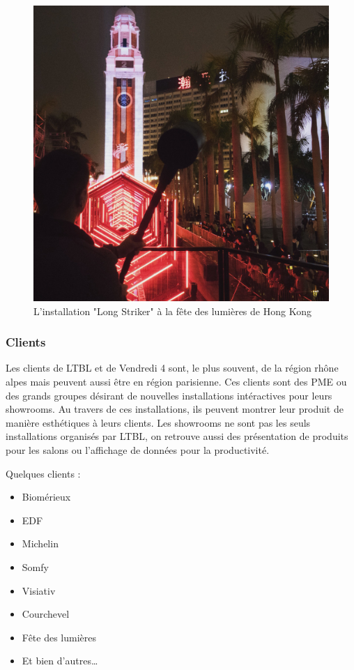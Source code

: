 \documentclass{article}
\begin{document}
\begin{figure}[h]
    \centering
    \includegraphics[scale=0.1]{long-striker.jpg}
    \caption{L'installation "Long Striker" à la fête des lumières de Hong Kong}
\end{figure}

\clearpage

\subsubsection{Clients}

Les clients de LTBL et de Vendredi 4 sont, le plus souvent, de la région rhône alpes mais peuvent aussi être en région parisienne.
Ces clients sont des PME ou des grands groupes désirant de nouvelles installations intéractives pour leurs showrooms.
Au travers de ces installations, ils peuvent montrer leur produit de manière esthétiques à leurs clients.
Les showrooms ne sont pas les seuls installations organisés par LTBL, on retrouve aussi des présentation de produits pour les salons ou l'affichage de données pour la productivité.

\medskip

Quelques clients :

\begin{itemize}
    \item Biomérieux
    \item EDF
    \item Michelin
    \item Somfy
    \item Visiativ
    \item Courchevel
    \item Fête des lumières
    \item Et bien d'autres\ldots
\end{itemize}
\end{document}
